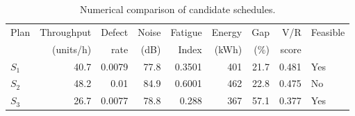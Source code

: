 \begin{table}[htbp]
\centering
\caption{Numerical comparison of candidate schedules.}
\label{tab:numerical-sim}
\small
\begin{tabular}{@{}lrrrrrrrl@{}}
\toprule
Plan & Throughput & Defect & Noise & Fatigue & Energy & Gap & V/R & Feasible \\
     & (units/h)  & rate   & (dB)  & Index   & (kWh)  & (\%) & score &         \\
\midrule
$S_{1}$ & 40.7 & 0.0079 & 77.8 & 0.3501 & 401 & 21.7 & 0.481 & Yes \\
$S_{2}$ & 48.2 & 0.01 & 84.9 & 0.6001 & 462 & 22.8 & 0.475 & No \\
$S_{3}$ & 26.7 & 0.0077 & 78.8 & 0.288 & 367 & 57.1 & 0.377 & Yes \\
\bottomrule
\end{tabular}
\end{table}
